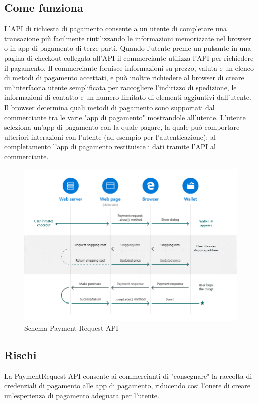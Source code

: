 \documentclass[italian]{article}
\begin{document}
	\subsection{Come funziona}	
	L'API di richiesta di pagamento consente a un utente di completare una transazione più facilmente riutilizzando le informazioni memorizzate nel browser o in app di pagamento di terze parti.
	Quando l'utente preme un pulsante in una pagina di checkout collegata all'API il commerciante utilizza l'API per richiedere il pagamento. Il commerciante fornisce informazioni su prezzo, valuta e un elenco di metodi di pagamento accettati, e può inoltre richiedere al browser di creare un'interfaccia utente semplificata per raccogliere l'indirizzo di spedizione, le informazioni di contatto e un numero limitato di elementi aggiuntivi dall'utente.
	Il browser determina quali metodi di pagamento sono supportati dal commerciante tra le varie "app di pagamento" mostrandole all'utente. 
	L'utente seleziona un'app di pagamento con la quale pagare, la quale può comportare ulteriori interazioni con l'utente (ad esempio per l'autenticazione); al completamento l'app di pagamento restituisce i dati tramite l'API al commerciante.

	\begin{figure}[h]
		\centering
		\includegraphics[width=1\linewidth]{SchemaPayment}
		\caption{Schema Payment Request API}
		\label{fig:Schema Payment}
	\end{figure}
	
	\subsection{Rischi}
	La PaymentRequest API consente ai commercianti di "consegnare" la raccolta di credenziali di pagamento alle app di pagamento, riducendo cosi l'onere di creare un'esperienza di pagamento adeguata per l'utente. 
	
\end{document}
